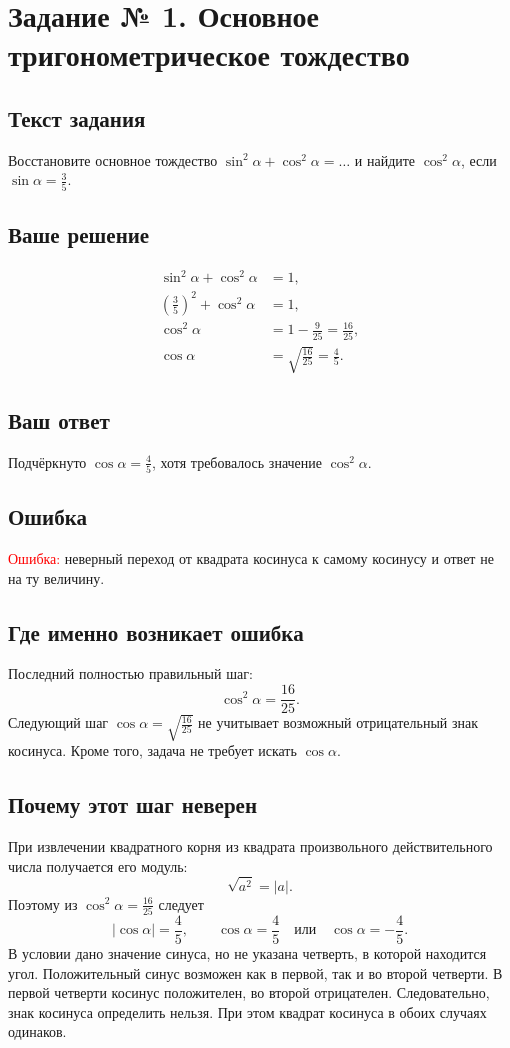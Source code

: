 \documentclass[12pt,a4paper]{article}
\begin{document}
\label{task:1}
\section*{Задание № 1. Основное тригонометрическое тождество}
\subsection*{Текст задания}
Восстановите основное тождество $\sin^2\alpha+\cos^2\alpha=\ldots$ и найдите $\cos^2\alpha$, если $\sin\alpha=\frac35$.

\subsection*{Ваше решение}
\begin{align*}
\sin^2\alpha+\cos^2\alpha&=1,\\
\left(\frac35\right)^2+\cos^2\alpha&=1,\\
\cos^2\alpha&=1-\frac9{25}=\frac{16}{25},\\
\cos\alpha&=\sqrt{\frac{16}{25}}=\frac45.
\end{align*}
\subsection*{Ваш ответ}
Подчёркнуто $\cos\alpha=\frac45$, хотя требовалось значение $\cos^2\alpha$.

\subsection*{Ошибка}
\textcolor{red}{Ошибка:} неверный переход от квадрата косинуса к самому косинусу и ответ не на ту величину.

\subsection*{Где именно возникает ошибка}
Последний полностью правильный шаг:
\[
\cos^2\alpha=\frac{16}{25}.
\]
Следующий шаг $\cos\alpha=\sqrt{\frac{16}{25}}$ не учитывает возможный отрицательный знак косинуса. Кроме того, задача не требует искать $\cos\alpha$.

\subsection*{Почему этот шаг неверен}
При извлечении квадратного корня из квадрата произвольного действительного числа получается его модуль:
\[
\sqrt{a^2}=|a|.
\]
Поэтому из $\cos^2\alpha=\frac{16}{25}$ следует
\[
|\cos\alpha|=\frac45,\qquad
\cos\alpha=\frac45\quad\text{или}\quad\cos\alpha=-\frac45.
\]
В условии дано значение синуса, но не указана четверть, в которой находится угол. Положительный синус возможен как в первой, так и во второй четверти. В первой четверти косинус положителен, во второй отрицателен. Следовательно, знак косинуса определить нельзя. При этом квадрат косинуса в обоих случаях одинаков.
\end{document}
